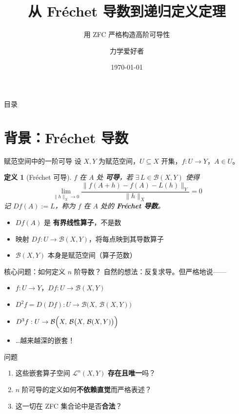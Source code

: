 \documentclass[10pt,aspectratio=169]{beamer}
\title{从 Fréchet 导数到递归定义定理}
\subtitle{用 ZFC 严格构造高阶可导性}
\author{力学爱好者}
\date{\today}
\newtheorem{dfn}{定义}[section]
\newcommand{\calL}{\mathcal{L}}
\newcommand{\calB}{\mathcal{B}}
\begin{document}
\begin{frame}
  \titlepage
\end{frame}

\begin{frame}{目录}
  \tableofcontents
\end{frame}

\section{背景：Fréchet 导数}

\begin{frame}{赋范空间中的一阶可导}
  设 $X, Y$ 为赋范空间，$U \subseteq X$ 开集，$f: U \to Y$，$A \in U$。

  \medskip
  \begin{dfn}[Fréchet 可导]
    $f$ 在 $A$ 处 \textbf{可导}，若 $\exists\, L \in \calB(X, Y)$ 使得
    \[
      \lim_{\|h\|_X \to 0}
      \frac{\|f(A+h) - f(A) - L(h)\|_Y}{\|h\|_X} = 0
    \]
    记 $Df(A) := L$，称为 $f$ 在 $A$ 处的 \textbf{Fréchet 导数}。
  \end{dfn}

  \medskip
  \begin{itemize}
    \item $Df(A)$ 是 \textbf{有界线性算子}，不是数
    \item 映射 $Df: U \to \calB(X, Y)$，将每点映到其导数算子
    \item $\calB(X, Y)$ 本身是赋范空间（算子范数）
  \end{itemize}
\end{frame}

\begin{frame}{核心问题：如何定义 $n$ 阶导数？}
  自然的想法：反复求导。但严格地说——

  \medskip
  \begin{itemize}
    \item $f: U \to Y$，$Df: U \to \calB(X, Y)$
    \item $D^2f = D(Df): U \to \calB\bigl(X,\, \calB(X, Y)\bigr)$
    \item $D^3f: U \to \calB\Bigl(X,\, \calB\bigl(X,\, \calB(X, Y)\bigr)\Bigr)$
    \item \ldots 越来越深的嵌套！
  \end{itemize}

  \medskip
  \begin{block}{问题}
    \begin{enumerate}
      \item 这些嵌套算子空间 $\calL^n(X,Y)$ \textbf{存在且唯一}吗？
      \item $n$ 阶可导的定义如何\textbf{不依赖直觉}而严格表述？
      \item 这一切在 ZFC 集合论中是否\textbf{合法}？
    \end{enumerate}
  \end{block}
\end{frame}
\end{document}
